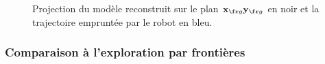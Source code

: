 \begin{figure}[H]
{  	\label{subfig:large a husky 4.5}
  }
  \hfil
  \hfil
  \hfil
  \caption[Résultats de reconstruction en simulation.]{
  Projection du modèle reconstruit sur le plan $\vect{x}_{\fr g}\vect{y}_{\fr g}$ en noir et la trajectoire empruntée par le robot en bleu.
  }
  \label{fig:relative size}
\end{figure}

\subsubsection{Comparaison à l'exploration par frontières}

